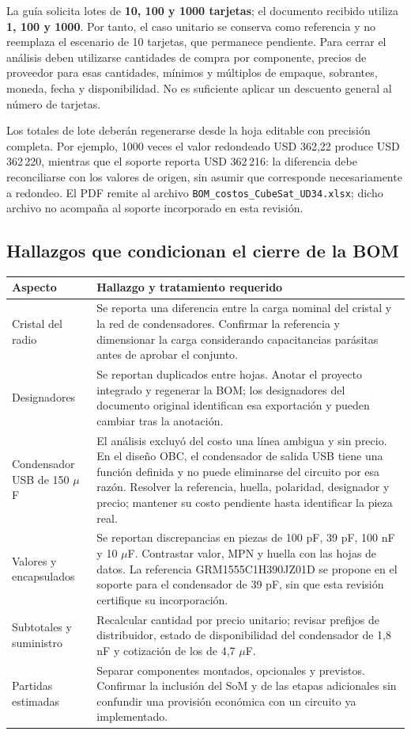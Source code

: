 \documentclass[11pt,letterpaper]{article}
\begin{document}
La guía solicita lotes de \textbf{10, 100 y 1000 tarjetas}; el documento recibido utiliza \textbf{1, 100 y 1000}. Por tanto, el caso unitario se conserva como referencia y no reemplaza el escenario de 10 tarjetas, que permanece pendiente. Para cerrar el análisis deben utilizarse cantidades de compra por componente, precios de proveedor para esas cantidades, mínimos y múltiplos de empaque, sobrantes, moneda, fecha y disponibilidad. No es suficiente aplicar un descuento general al número de tarjetas.

Los totales de lote deberán regenerarse desde la hoja editable con precisión completa. Por ejemplo, 1000 veces el valor redondeado USD 362,22 produce USD 362\,220, mientras que el soporte reporta USD 362\,216: la diferencia debe reconciliarse con los valores de origen, sin asumir que corresponde necesariamente a redondeo. El PDF remite al archivo \texttt{BOM\_costos\_CubeSat\_UD34.xlsx}; dicho archivo no acompaña al soporte incorporado en esta revisión.

\subsection{Hallazgos que condicionan el cierre de la BOM}
\begin{longtable}{L{3.2cm}L{11.3cm}}
\toprule Aspecto & Hallazgo y tratamiento requerido \\
\midrule\endhead
Cristal del radio & Se reporta una diferencia entre la carga nominal del cristal y la red de condensadores. Confirmar la referencia y dimensionar la carga considerando capacitancias parásitas antes de aprobar el conjunto. \\
Designadores & Se reportan duplicados entre hojas. Anotar el proyecto integrado y regenerar la BOM; los designadores del documento original identifican esa exportación y pueden cambiar tras la anotación. \\
Condensador USB de 150 $\mu$F & El análisis excluyó del costo una línea ambigua y sin precio. En el diseño OBC, el condensador de salida USB tiene una función definida y no puede eliminarse del circuito por esa razón. Resolver la referencia, huella, polaridad, designador y precio; mantener su costo pendiente hasta identificar la pieza real. \\
Valores y encapsulados & Se reportan discrepancias en piezas de 100 pF, 39 pF, 100 nF y 10 $\mu$F. Contrastar valor, MPN y huella con las hojas de datos. La referencia GRM1555C1H390JZ01D se propone en el soporte para el condensador de 39 pF, sin que esta revisión certifique su incorporación. \\
Subtotales y suministro & Recalcular cantidad por precio unitario; revisar prefijos de distribuidor, estado de disponibilidad del condensador de 1,8 nF y cotización de los de 4,7 $\mu$F. \\
Partidas estimadas & Separar componentes montados, opcionales y previstos. Confirmar la inclusión del SoM y de las etapas adicionales sin confundir una provisión económica con un circuito ya implementado. \\
\bottomrule
\end{longtable}
\end{document}
